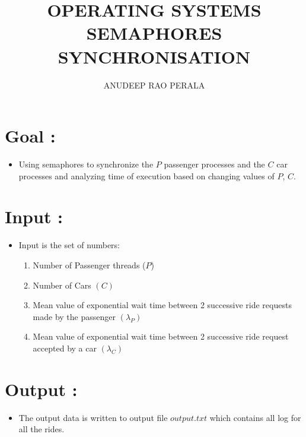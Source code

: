 \documentclass[12pt,a4paper]{article}
\title{OPERATING SYSTEMS \\ SEMAPHORES SYNCHRONISATION}
\author{ANUDEEP RAO PERALA}
\date{}
\begin{document}
	\maketitle
	
	\tableofcontents
	\newpage
	
	\section{Goal :}
	\begin{itemize}
		\item Using semaphores to synchronize the $P$ passenger processes and the $C$ car processes and analyzing time of execution based on changing values of $P$, $C$.
	\end{itemize}
	\section{Input :}
	\begin{itemize}
		\item Input is the set of numbers:
		\begin{enumerate}
			\item Number of Passenger threads ($P$)
			\item Number of Cars $(C)$
			\item Mean value of exponential wait time between 2 successive ride requests made by the passenger $(\lambda _P)$
\item Mean value of exponential wait time between 2 successive ride request accepted by a car $(\lambda _C)$
		\end{enumerate}
		
	\end{itemize}
	\section{Output :}
	\begin{itemize}
		\item The output data is written to output file $output.txt$ which contains all log for all the rides.
	\end{itemize}
	
\end{document}

